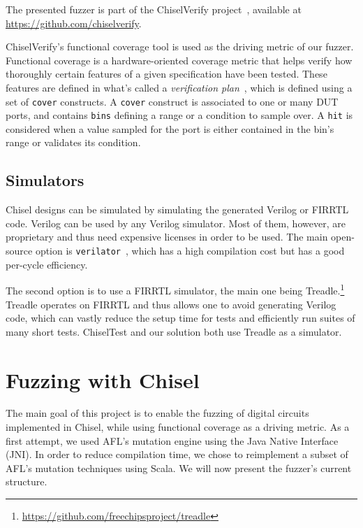 \documentclass[conference]{IEEEtran}
\begin{document}
The presented fuzzer is part of the ChiselVerify project~\cite{verify:chisel:2020, dobis2021opensource}, available
at \url{https://github.com/chiselverify}.

ChiselVerify's functional coverage tool is used as the driving metric of our fuzzer.
Functional coverage is a hardware-oriented coverage metric that helps verify how thoroughly certain features of a given specification have been tested.
These features are defined in what's called a \textit{verification plan}~\cite{spear2008systemverilog}, which is defined using a set of \texttt{cover} constructs. 
A \texttt{cover} construct is associated to one or many DUT ports, and contains \texttt{bins} defining a range or a condition to sample over.
A \texttt{hit} is considered when a value sampled for the port is either contained in the bin's range or validates its condition.

\subsection{Simulators}

Chisel designs can be simulated by simulating the generated Verilog or FIRRTL code.
Verilog can be used by any Verilog simulator.
Most of them, however, are proprietary and thus need expensive licenses in order to be used. 
The main open-source option is \texttt{verilator}~\cite{verilator}, which has a high compilation cost but has a good per-cycle efficiency.

The second option is to use a FIRRTL simulator, the main one being Treadle.\footnote{\url{https://github.com/freechipsproject/treadle}}
Treadle operates on FIRRTL and thus allows one to avoid generating Verilog code, which can vastly reduce the setup time for tests and efficiently run suites of many short tests.
ChiselTest and our solution both use Treadle as a simulator. 

\section{Fuzzing with Chisel}
\label{sec:fuzz}
The main goal of this project is to enable the fuzzing of digital circuits implemented in Chisel, while using functional coverage as a driving metric.
As a first attempt, we used AFL's mutation engine using the Java Native Interface (JNI).
In order to reduce compilation time, we chose to reimplement a subset of AFL's mutation techniques using Scala.
We will now present the fuzzer's current structure.
\end{document}
